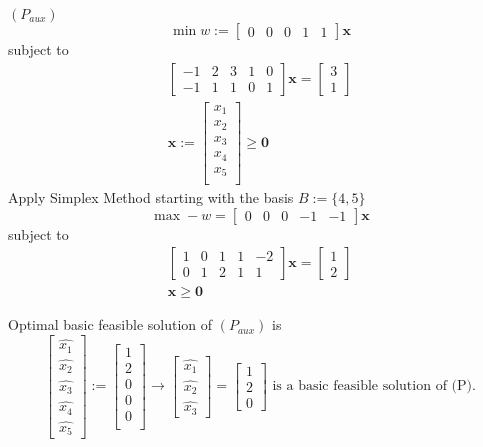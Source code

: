 $ (P_{aux}) $ 
\[\min w:=\begin{bmatrix} 0 & 0 & 0 & 1 & 1 \end{bmatrix} \bm{x} \]
subject to
\begin{align}
    \begin{bmatrix}
        -1 & 2 & 3 & 1 & 0\\
        -1 & 1 & 1 & 0 & 1
    \end{bmatrix}
    \bm{x}=
    \begin{bmatrix}
        3\\
        1
    \end{bmatrix}\\
    \bm{x}:=
    \begin{bmatrix}
        x_1\\
        x_2\\
        x_3\\
        x_4\\
        x_5\\
    \end{bmatrix} \ge \bm{0}
\end{align}
Apply Simplex Method starting with the basis $ B:=\{4,5\} $
\[\max -w=\begin{bmatrix} 0 & 0 & 0 & -1 & -1 \end{bmatrix} \bm{x} \]
subject to
\begin{align}
    \begin{bmatrix}
        1 & 0 & 1 & 1 & -2\\
        0 & 1 & 2 & 1 & 1
    \end{bmatrix}
    \bm{x}=
    \begin{bmatrix}
        1\\
        2
    \end{bmatrix}\\
    \bm{x}\ge \bm{0}
\end{align}

Optimal basic feasible solution of $ (P_{aux}) $ is
\[ 
    \begin{bmatrix}
        \hat{x_1}\\
        \hat{x_2}\\
        \hat{x_3}\\
        \hat{x_4}\\
        \hat{x_5}
    \end{bmatrix}
    :=
    \begin{bmatrix}
        1\\
        2\\
        0\\
        0\\
        0\\
    \end{bmatrix}
    \rightarrow
    \begin{bmatrix}
        \hat{x_1}\\
        \hat{x_2}\\
        \hat{x_3}
    \end{bmatrix}
    =
    \begin{bmatrix}
        1\\
        2\\
        0
    \end{bmatrix}
    \text{ is a basic feasible solution of (P).}
\]

